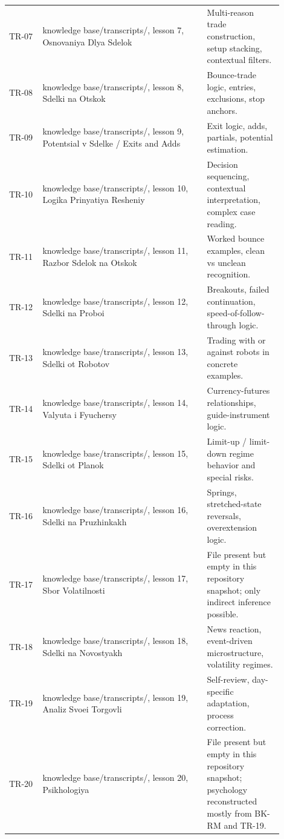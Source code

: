 \begin{longtable}{p{0.11\linewidth}p{0.54\linewidth}p{0.25\linewidth}}
TR-07 & knowledge base/transcripts/, lesson 7, Osnovaniya Dlya Sdelok & Multi-reason trade construction, setup stacking, contextual filters. \\
TR-08 & knowledge base/transcripts/, lesson 8, Sdelki na Otskok & Bounce-trade logic, entries, exclusions, stop anchors. \\
TR-09 & knowledge base/transcripts/, lesson 9, Potentsial v Sdelke / Exits and Adds & Exit logic, adds, partials, potential estimation. \\
TR-10 & knowledge base/transcripts/, lesson 10, Logika Prinyatiya Resheniy & Decision sequencing, contextual interpretation, complex case reading. \\
TR-11 & knowledge base/transcripts/, lesson 11, Razbor Sdelok na Otskok & Worked bounce examples, clean vs unclean recognition. \\
TR-12 & knowledge base/transcripts/, lesson 12, Sdelki na Proboi & Breakouts, failed continuation, speed-of-follow-through logic. \\
TR-13 & knowledge base/transcripts/, lesson 13, Sdelki ot Robotov & Trading with or against robots in concrete examples. \\
TR-14 & knowledge base/transcripts/, lesson 14, Valyuta i Fyuchersy & Currency-futures relationships, guide-instrument logic. \\
TR-15 & knowledge base/transcripts/, lesson 15, Sdelki ot Planok & Limit-up / limit-down regime behavior and special risks. \\
TR-16 & knowledge base/transcripts/, lesson 16, Sdelki na Pruzhinkakh & Springs, stretched-state reversals, overextension logic. \\
TR-17 & knowledge base/transcripts/, lesson 17, Sbor Volatilnosti & File present but empty in this repository snapshot; only indirect inference possible. \\
TR-18 & knowledge base/transcripts/, lesson 18, Sdelki na Novostyakh & News reaction, event-driven microstructure, volatility regimes. \\
TR-19 & knowledge base/transcripts/, lesson 19, Analiz Svoei Torgovli & Self-review, day-specific adaptation, process correction. \\
TR-20 & knowledge base/transcripts/, lesson 20, Psikhologiya & File present but empty in this repository snapshot; psychology reconstructed mostly from BK-RM and TR-19. \\
\bottomrule
\end{longtable}

